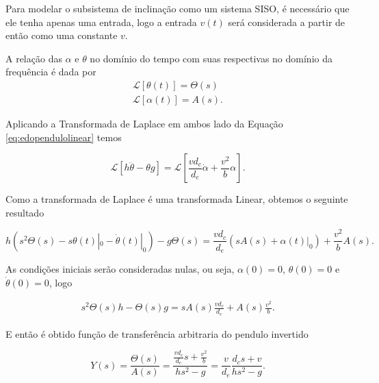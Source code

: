             Para modelar o subsistema de inclinação como um sistema SISO, é necessário que ele tenha apenas uma entrada, logo a entrada $v(t)$ será considerada a partir de então como uma constante $v$.
        
            A relação das $\alpha$ e $\theta$ no domínio do tempo com suas respectivas no domínio da frequência é dada por 
            \begin{eqnarray}
                \mathcal{L} [\theta(t)] = \Theta(s)   \nonumber \\
                \mathcal{L} [\alpha(t)] = A(s).
            \end{eqnarray}
            
            Aplicando a Transformada de Laplace em ambos lado da Equação \eqref{eq:edopendulolinear} temos
            
            \begin{equation}
                 \mathcal{L} [h \ddot \theta -\theta g] = \mathcal{L} [\frac{vd_c}{d_e}\dot \alpha +\frac{v^2}{b}\alpha].
            \end{equation}
            
            Como a transformada de Laplace é uma transformada Linear, obtemos o seguinte resultado
            
            \begin{equation}
                h(s^2\Theta(s) - s\theta(t)|_0 - \dot\theta(t)|_0) - g\Theta(s) = \frac{vd_c}{d_e} (sA(s) + \alpha(t)|_0) + \frac{v^2}{b}A(s).
            \end{equation}
            
            As condições iniciais serão consideradas nulas, ou seja, $\alpha(0) = 0$, $\theta(0) = 0$ e $\dot\theta(0)=0$, logo
            
            \begin{eqnarray}
                s^2\Theta(s)h - \Theta(s)g = sA(s)\frac{vd_c}{d_e} + A(s)\frac{v^2}{b}.
            \end{eqnarray}
            
            E então é obtido função de transferência arbitraria do pendulo invertido
            
            \begin{equation}
                Y(s)
                = \frac{\Theta(s)}{A(s)}
                = \frac{\frac{vd_c}{d_e}s + \frac{v^2}{b}} {hs^2 - g}
                = \frac{v}{d_e} \frac{d_cs + v} {hs^2 - g}.
                \label{eq:pendulofinal}
            \end{equation}
                
